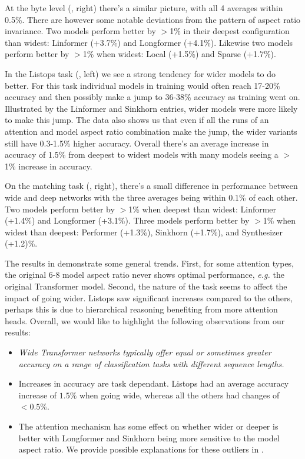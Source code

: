 At the byte level (, right) there's a similar picture, with all 4 averages within 0.5\%.
There are however some notable deviations from the pattern of aspect ratio invariance.
Two models perform better by $>$1\% in their deepest configuration than widest: Linformer (+3.7\%) and Longformer (+4.1\%).
Likewise two models perform better by $>$1\% when widest: Local (+1.5\%) and Sparse (+1.7\%).



In the Listops task (, left) we see a strong tendency for wider models to do better.
For this task individual models in training would often reach 17-20\% accuracy and then possibly make a jump to 36-38\% accuracy as training went on.
Illustrated by the Linformer and Sinkhorn entries, wider models were more likely to make this jump.
The data also shows us that even if all the runs of an attention and model aspect ratio combination make the jump, the wider variants still have 0.3-1.5\% higher accuracy.
Overall there's an average increase in accuracy of 1.5\% from deepest to widest models with many models seeing a $>$1\% increase in accuracy.

On the matching task (, right), there's a small difference in performance between wide and deep networks with the three averages being within 0.1\% of each other.
Two models perform better by $>$1\% when deepest than widest: Linformer (+1.4\%) and Longformer (+3.1\%).
Three models perform better by $>$1\% when widest than deepest: Performer (+1.3\%), Sinkhorn (+1.7\%), and Synthesizer (+1.2)\%.

The results in  demonstrate some general trends.
First, for some attention types, the original 6-8 model aspect ratio never shows optimal performance, \textit{e.g.} the original Transformer model.
Second, the nature of the task seems to affect the impact of going wider.
Listops saw significant increases compared to the others, perhaps this is due to hierarchical reasoning benefiting from more attention heads.
Overall, we would like to highlight the following observations from our results:

\begin{itemize}
    \item \emph{Wide Transformer networks typically offer equal or sometimes greater accuracy on a range of classification tasks with different sequence lengths.}
    \item Increases in accuracy are task dependant. Listops had an average accuracy increase of $1.5\%$ when going wide, whereas all the others had changes of $<0.5\%$.
    \item The attention mechanism has some effect on whether wider or deeper is better with Longformer and Sinkhorn being more sensitive to the model aspect ratio. We provide possible explanations for these outliers in .
\end{itemize}

